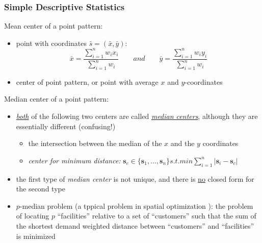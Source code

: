 \documentclass[10pt]{beamer}\usepackage[]{graphicx}\usepackage[]{color}
\newcommand{\vecss}{\boldsymbol{s}}
\newcommand{\bitemize}{\begin{itemize}}
\newcommand{\eitemize}{\end{itemize}}
\newcommand{\bblock}{\begin{block}}
\newcommand{\eblock}{\end{block}}
\begin{document}
\begin{frame}
\frametitle{Simple Descriptive Statistics}
\bblock{Mean center of a point pattern:}
\begin{itemize}
\item point with coordinates $\bar{s} = (\bar{x}, \bar{y})$:
\begin{equation*}
\bar{x}=\frac{\sum_{i=1}^{n} w_ix_i}{\sum_{i=1}^nw_i} \qquad {and} \qquad \bar{y}=\frac{\sum_{i=1}^{n} w_iy_i}{\sum_{i=1}^nw_i}
\end{equation*}
\item center of point pattern, or point with average $x$ and $y$-coordinates
\end{itemize}
\eblock

\vspace{-0.2cm}
\bblock{Median center of a point pattern:}
\bitemize
\item \underline{\it both} of the following two centers are called \underline{\it median centers}, although they are essentially different (confusing!)
\bitemize
\item the intersection between the median of the $x$ and the $y$ coordinates
\item {\it center for minimum distance:} $\vecss_c\in\{\vecss_1, \ldots, \vecss_n\}  s.t.  min \sum\limits_{i=1}^{n}|\vecss_i-\vecss_c|$
\eitemize
\item the first type of {\it median center} is not unique, and there is \underline{no} closed form for the second type
\item $p$-median problem (a tppical problem in spatial optimization ): {\scriptsize the problem of locating $p$ ``facilities'' relative to a set of ``customers'' such that the sum of the shortest demand weighted distance between ``customers'' and ``facilities'' is minimized}
\eitemize
\eblock


\end{frame}
%
%
%
%
%
%
%
\end{document}
